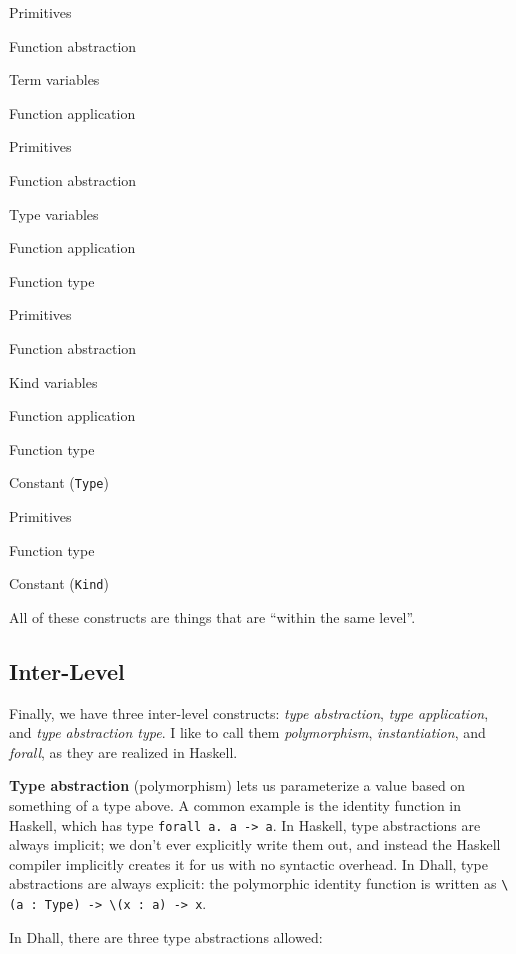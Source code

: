 \documentclass[]{article}
\begin{document}
\begin{description}
\tightlist
\item[Term]
Primitives

Function abstraction

Term variables

Function application
\item[Type]
Primitives

Function abstraction

Type variables

Function application

Function type
\item[Kind]
Primitives

Function abstraction

Kind variables

Function application

Function type

Constant (\texttt{Type})
\item[Sort]
Primitives

Function type

Constant (\texttt{Kind})
\end{description}

All of these constructs are things that are ``within the same level''.

\hypertarget{inter-level}{%
\subsection{Inter-Level}\label{inter-level}}

Finally, we have three inter-level constructs: \emph{type abstraction},
\emph{type application}, and \emph{type abstraction type}. I like to call them
\emph{polymorphism}, \emph{instantiation}, and \emph{forall}, as they are
realized in Haskell.

\textbf{Type abstraction} (polymorphism) lets us parameterize a value based on
something of a type above. A common example is the identity function in Haskell,
which has type \texttt{forall\ a.\ a\ -\textgreater{}\ a}. In Haskell, type
abstractions are always implicit; we don't ever explicitly write them out, and
instead the Haskell compiler implicitly creates it for us with no syntactic
overhead. In Dhall, type abstractions are always explicit: the polymorphic
identity function is written as
\texttt{\textbackslash{}(a\ :\ Type)\ -\textgreater{}\ \textbackslash{}(x\ :\ a)\ -\textgreater{}\ x}.

In Dhall, there are three type abstractions allowed:
\end{document}
